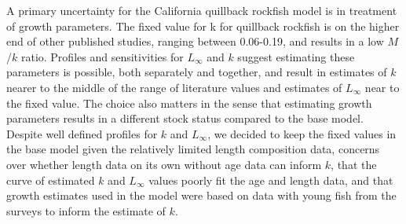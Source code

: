 \documentclass[11pt,
  english,
  a4paper,
]{article}
\begin{document}
A primary uncertainty for the California quillback rockfish model is in treatment of growth parameters. The fixed value for k for quillback rockfish is on the higher end of other published studies, ranging between 0.06-0.19, and results in a low {\(M\)\leavevmode\tagmcend\tagstructend}/{\(k\)\leavevmode\tagmcend\tagstructend} ratio. Profiles and sensitivities for {\(L_{\infty}\)\leavevmode\tagmcend\tagstructend} and {\(k\)\leavevmode\tagmcend\tagstructend} suggest estimating these parameters is possible, both separately and together, and result in estimates of {\(k\)\leavevmode\tagmcend\tagstructend} nearer to the middle of the range of literature values and estimates of {\(L_{\infty}\)\leavevmode\tagmcend\tagstructend} near to the fixed value. The choice also matters in the sense that estimating growth parameters results in a different stock status compared to the base model. Despite well defined profiles for {\(k\)\leavevmode\tagmcend\tagstructend} and {\(L_{\infty}\)\leavevmode\tagmcend\tagstructend}, we decided to keep the fixed values in the base model given the relatively limited length composition data, concerns over whether length data on its own without age data can inform {\(k\)\leavevmode\tagmcend\tagstructend}, that the curve of estimated {\(k\)\leavevmode\tagmcend\tagstructend} and {\(L_{\infty}\)\leavevmode\tagmcend\tagstructend} values poorly fit the age and length data, and that growth estimates used in the model were based on data with young fish from the surveys to inform the estimate of {\(k\)\leavevmode\tagmcend\tagstructend}.

\leavevmode\tagmcend\tagstructend\par

\end{document}
